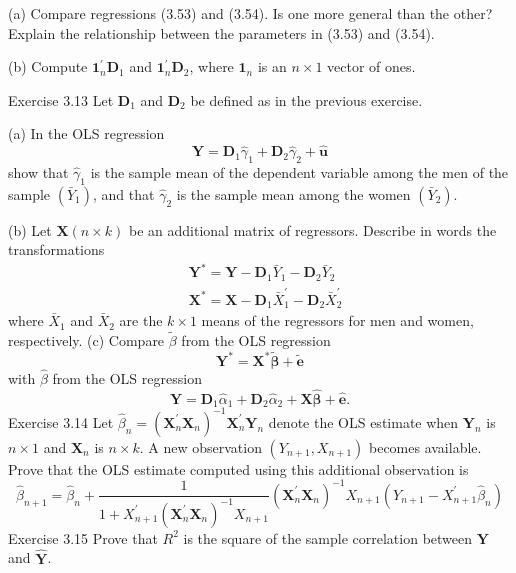 \documentclass[10pt]{article}
\begin{document}
(a) Compare regressions (3.53) and (3.54). Is one more general than the other? Explain the relationship between the parameters in (3.53) and (3.54).

(b) Compute $\mathbf{1}_{n}^{\prime} \boldsymbol{D}_{1}$ and $\mathbf{1}_{n}^{\prime} \boldsymbol{D}_{2}$, where $\mathbf{1}_{n}$ is an $n \times 1$ vector of ones.

Exercise 3.13 Let $\boldsymbol{D}_{1}$ and $\boldsymbol{D}_{2}$ be defined as in the previous exercise.

(a) In the OLS regression
$$
\boldsymbol{Y}=\boldsymbol{D}_{1} \widehat{\gamma}_{1}+\boldsymbol{D}_{2} \widehat{\gamma}_{2}+\widehat{\boldsymbol{u}}
$$
show that $\widehat{\gamma}_{1}$ is the sample mean of the dependent variable among the men of the sample $\left(\bar{Y}_{1}\right)$, and that $\widehat{\gamma}_{2}$ is the sample mean among the women $\left(\bar{Y}_{2}\right)$.

(b) Let $\boldsymbol{X}(n \times k)$ be an additional matrix of regressors. Describe in words the transformations
$$
\begin{aligned}
&\boldsymbol{Y}^{*}=\boldsymbol{Y}-\boldsymbol{D}_{1} \bar{Y}_{1}-\boldsymbol{D}_{2} \bar{Y}_{2} \\
&\boldsymbol{X}^{*}=\boldsymbol{X}-\boldsymbol{D}_{1} \bar{X}_{1}^{\prime}-\boldsymbol{D}_{2} \bar{X}_{2}^{\prime}
\end{aligned}
$$
where $\bar{X}_{1}$ and $\bar{X}_{2}$ are the $k \times 1$ means of the regressors for men and women, respectively. (c) Compare $\widetilde{\beta}$ from the OLS regression
$$
\boldsymbol{Y}^{*}=\boldsymbol{X}^{*} \widetilde{\boldsymbol{\beta}}+\widetilde{\boldsymbol{e}}
$$
with $\widehat{\beta}$ from the OLS regression
$$
\boldsymbol{Y}=\boldsymbol{D}_{1} \widehat{\alpha}_{1}+\boldsymbol{D}_{2} \widehat{\alpha}_{2}+\boldsymbol{X} \widehat{\boldsymbol{\beta}}+\widehat{\boldsymbol{e}} .
$$
Exercise 3.14 Let $\widehat{\beta}_{n}=\left(\boldsymbol{X}_{n}^{\prime} \boldsymbol{X}_{n}\right)^{-1} \boldsymbol{X}_{n}^{\prime} \boldsymbol{Y}_{n}$ denote the OLS estimate when $\boldsymbol{Y}_{n}$ is $n \times 1$ and $\boldsymbol{X}_{n}$ is $n \times k$. A new observation $\left(Y_{n+1}, X_{n+1}\right)$ becomes available. Prove that the OLS estimate computed using this additional observation is
$$
\widehat{\beta}_{n+1}=\widehat{\beta}_{n}+\frac{1}{1+X_{n+1}^{\prime}\left(\boldsymbol{X}_{n}^{\prime} \boldsymbol{X}_{n}\right)^{-1} X_{n+1}}\left(\boldsymbol{X}_{n}^{\prime} \boldsymbol{X}_{n}\right)^{-1} X_{n+1}\left(Y_{n+1}-X_{n+1}^{\prime} \widehat{\beta}_{n}\right)
$$
Exercise 3.15 Prove that $R^{2}$ is the square of the sample correlation between $\boldsymbol{Y}$ and $\widehat{\boldsymbol{Y}}$.
\end{document}
